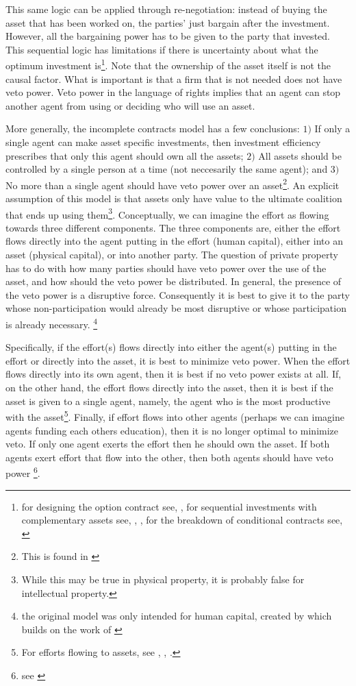 This same logic can be applied through re-negotiation: instead of buying the asset that has been worked on, the parties’ just bargain after the investment. However, all the bargaining power has to be given to the party that invested. This sequential logic has limitations if there is uncertainty about what the optimum investment is\footnote{for designing the option contract see, \cite{Noldeke1998}, for sequential investments with complementary assets see, \cite{Zhang2014},\cite{bessen_maskin} , for the breakdown of conditional contracts see, \cite{Maskin1999}}. Note that the ownership of the asset itself is not the causal factor. What is important is that a firm that is not needed does not have veto power. Veto power in the language of rights implies that an agent can stop another agent from using or deciding who will use an asset. 

More generally, the incomplete contracts model has a few conclusions: $1)$ If only a single agent can make asset specific investments, then investment efficiency prescribes that only this agent should own all the assets; $2)$ All assets should be controlled by a single person at a time (not neccesarily the same agent); and $3)$ No more than a single agent should have veto power over an asset\footnote{This is found in \cite{Hart1990}}. An explicit assumption of this model is that assets only have value to the ultimate coalition that ends up using them\footnote{While this may be true in physical property, it is probably false for intellectual property.}. Conceptually, we can imagine the effort as flowing towards three different components. The three components are, either the effort flows directly into the agent putting in the effort (human capital), either into an asset (physical capital), or into another party. The question of private property has to do with how many parties should have veto power over the use of the asset, and how should the veto power be distributed. In general, the presence of the veto power is a disruptive force. Consequently it is best to give it to the party whose non-participation would already be most disruptive or whose participation is already necessary. \footnote{the original model was only intended for human capital, created by \cite{Hart1990} which builds on the work of \cite{Grossman1986} }

Specifically, if the effort(s) flows directly into either the agent(s) putting in the effort or directly into the asset, it is best to minimize veto power. When the effort flows directly into its  own agent, then it is best if no veto power exists at all. If, on the other hand, the effort flows directly into the asset, then it is best if the asset is given to a single agent, namely, the agent who is the most productive with the asset\footnote{For efforts flowing to assets, see \cite{schmitz2013investments}, \citet{gattai2016investment}, \cite{schmitz2017incomplete}. }. Finally, if effort flows into other agents (perhaps we can imagine agents funding each others education), then it is no longer optimal to minimize veto. If only one agent exerts the effort then he should own the asset. If both agents exert effort that flow into the other, then both agents should have veto power \footnote{see \cite{hamada2011incentive}}.

